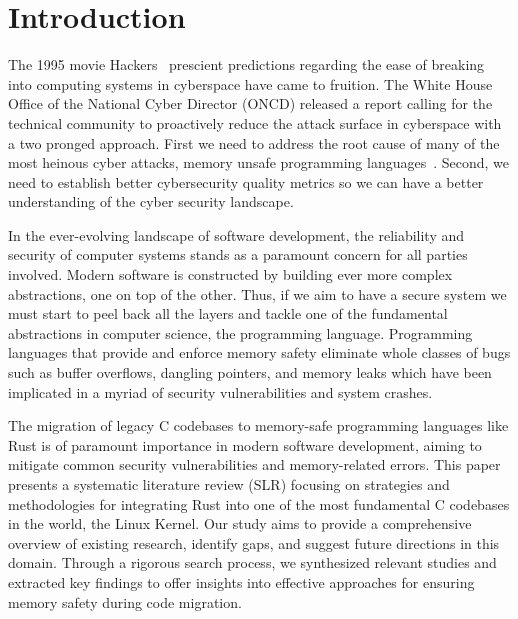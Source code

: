 \documentclass[sigconf]{acmart}
\begin{document}


\maketitle

\section{Introduction}

The 1995 movie Hackers~\cite{Wikipedia_contributors2024-zr} prescient predictions regarding the ease
of breaking into computing systems in cyberspace have came to fruition. The White House Office of
the National Cyber Director (ONCD) released a report calling for the technical community to
proactively reduce the attack surface in cyberspace with a two pronged approach. First we need to
address the root cause of many of the most heinous cyber attacks, memory unsafe programming
languages~\cite{United_States_Gov2024-pp}. Second, we need to establish better cybersecurity quality
metrics so we can have a better understanding of the cyber security landscape.

In the ever-evolving landscape of software development, the reliability and security of computer
systems stands as a paramount concern for all parties involved. Modern software is constructed by
building ever more complex abstractions, one on top of the other. Thus, if we aim to have a secure
system we must start to peel back all the layers and tackle one of the fundamental abstractions in
computer science, the programming language. Programming languages that provide and enforce memory
safety eliminate whole classes of bugs such as buffer overflows, dangling pointers, and memory leaks
which have been implicated in a myriad of security vulnerabilities and system crashes.

The migration of legacy C codebases to memory-safe programming languages like Rust is of paramount
importance in modern software development, aiming to mitigate common security vulnerabilities and
memory-related errors. This paper presents a systematic literature review (SLR) focusing on
strategies and methodologies for integrating Rust into one of the most fundamental C codebases in
the world, the Linux Kernel.  Our study aims to provide a comprehensive overview of existing
research, identify gaps, and suggest future directions in this domain. Through a rigorous search
process, we synthesized relevant studies and extracted key findings to offer insights into effective
approaches for ensuring memory safety during code migration.
\end{document}
